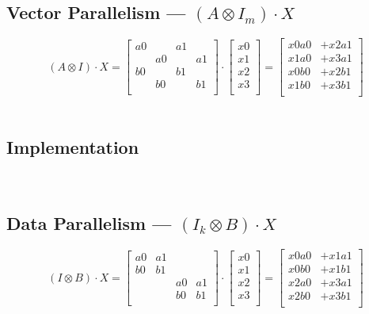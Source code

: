 \documentclass[11pt]{article}
\begin{document}
\subsection*{Vector Parallelism --- $(A\otimes I_{m})\cdot X$ }
\begin{displaymath}
	(A\otimes I)\cdot X = 
	\begin{bmatrix}
	a0 &  & a1 & \\
	 & a0 &  & a1 \\
	b0 &  & b1 &  \\
	 & b0 &  & b1 \\
	\end{bmatrix}
	\cdot
	\begin{bmatrix}
	x0 \\
	x1 \\
	x2 \\
	x3 \\
	\end{bmatrix}
	=
	\begin{bmatrix}
	x0a0 & + x2a1 \\
	x1a0 & + x3a1 \\
	x0b0 & + x2b1 \\
	x1b0 & + x3b1 \\
	\end{bmatrix}
\end{displaymath}\\
\subsection*{Implementation}
\begin{center}
\\
\end{center}
\subsection*{Data Parallelism --- $(I_{k}\otimes B)\cdot X$ }
\begin{displaymath}
	(I\otimes B)\cdot X = 
	\begin{bmatrix}
	a0 & a1 &  & \\
	b0 & b1 &  &  \\
	 &  & a0 & a1 \\
	 &  & b0 & b1 \\
	\end{bmatrix}
	\cdot
	\begin{bmatrix}
	x0 \\
	x1 \\
	x2 \\
	x3 \\
	\end{bmatrix}
	=
	\begin{bmatrix}
	x0a0 & + x1a1 \\
	x0b0 & + x1b1 \\
	x2a0 & + x3a1 \\
	x2b0 & + x3b1 \\
	\end{bmatrix}
\end{displaymath}\\
\end{document}
